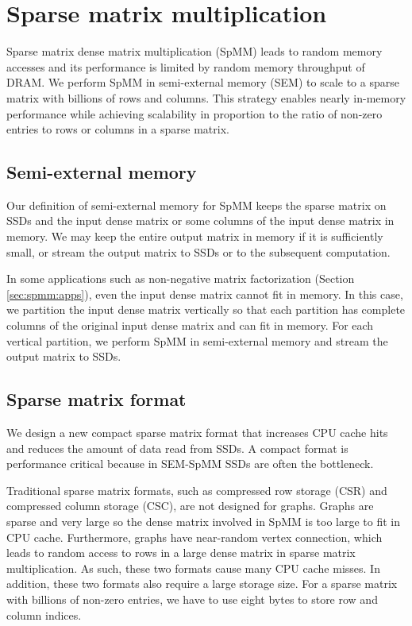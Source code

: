 \section{Sparse matrix multiplication} \label{sec:spmm}
Sparse matrix dense matrix multiplication (SpMM) leads to random memory
accesses and its performance is limited by random memory throughput
of DRAM. We perform SpMM in semi-external memory (SEM)
to scale to a sparse matrix with billions of rows and columns. This strategy enables
nearly in-memory performance while achieving scalability in proportion
to the ratio of non-zero entries to rows or columns in a sparse matrix.

\subsection{Semi-external memory}
Our definition of semi-external memory for SpMM keeps the sparse matrix on
SSDs and the input dense matrix or some columns of the input dense matrix
in memory. We may keep the entire output matrix in memory if it is sufficiently
small, or stream the output matrix to SSDs or to the subsequent computation.

In some applications such as non-negative matrix factorization (Section
\ref{sec:spmm:apps}), even the input dense matrix cannot fit in memory. In this case,
we partition the input dense matrix vertically so that each partition has
complete columns of the original input dense matrix and can fit in memory.
For each vertical partition, we perform SpMM in semi-external memory and
stream the output matrix to SSDs.

\subsection{Sparse matrix format}
We design a new compact
sparse matrix format that increases CPU cache hits and reduces the amount of data
read from SSDs. A compact format is performance critical because in SEM-SpMM SSDs
are often the bottleneck.

Traditional sparse matrix formats, such as compressed row storage (CSR) and
compressed column storage (CSC), are not designed for graphs. Graphs are sparse
and very large so the dense matrix involved in SpMM is too large to fit in CPU
cache. Furthermore, graphs have near-random vertex connection, which
leads to random access to rows in a large dense matrix in sparse matrix
multiplication. As such, these two formats cause
many CPU cache misses. In addition, these two formats also require a large
storage size. For a sparse matrix with billions of non-zero entries, we have to
use eight bytes to store row and column indices.

